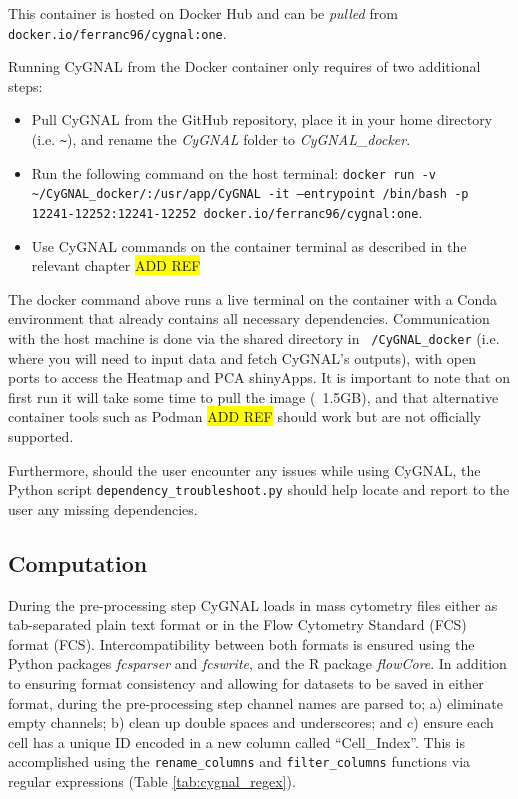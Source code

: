 This container is hosted on Docker Hub and can be \emph{pulled} from \texttt{docker.io/ferranc96/cygnal:one}.

Running CyGNAL from the Docker container only requires of two additional steps:

\begin{itemize}

\item Pull CyGNAL from the GitHub repository, place it in your home directory (i.e. \texttt{\textasciitilde}), and rename the \emph{CyGNAL} folder to \emph{CyGNAL\_docker}. 

\item Run the following command on the host terminal:\newline
\texttt{docker run -v \textasciitilde/CyGNAL\_docker/:/usr/app/CyGNAL -it\newline
--entrypoint /bin/bash -p 12241-12252:12241-12252\newline
docker.io/ferranc96/cygnal:one}. 

\item Use CyGNAL commands on the container terminal as described in the relevant chapter \colorbox{yellow}{ADD REF}

\end{itemize}

The docker command above runs a live terminal on the container with a Conda environment that already contains all necessary dependencies. Communication with the host machine is done via the shared directory in \texttt{~/CyGNAL\_docker} (i.e. where you will need to input data and fetch CyGNAL's outputs), with open ports to access the Heatmap and PCA shinyApps. 
It is important to note that on first run it will take some time to pull the image (~1.5GB), and that alternative container tools such as Podman \colorbox{yellow}{ADD REF} should work but are not officially supported.

Furthermore, should the user encounter any issues while using CyGNAL, the Python script \texttt{dependency\_troubleshoot.py} should help locate and report to the user any missing dependencies.

\subsection{Computation}

During the pre-processing step CyGNAL loads in mass cytometry files either as tab-separated plain text format or in the Flow Cytometry Standard (FCS) format (FCS)\cite{spidlen_data_2010}. Intercompatibility between both formats is ensured using the Python packages \emph{fcsparser}\cite{yurtsev_eyurtsevfcsparser_2020} and \emph{fcswrite}\cite{noauthor_zellmechanik-dresdenfcswrite_2021}, and the R package \emph{flowCore}\cite{ellis_flowcore_2021}. In addition to ensuring format consistency and allowing for datasets to be saved in either format, during the pre-processing step channel names are parsed to; a) eliminate empty channels; b) clean up double spaces and underscores; and c) ensure each cell has a unique ID encoded in a new column called “Cell\_Index”. This is accomplished using the \texttt{rename\_columns} and \texttt{filter\_columns} functions via regular expressions (Table \ref{tab:cygnal_regex}).

